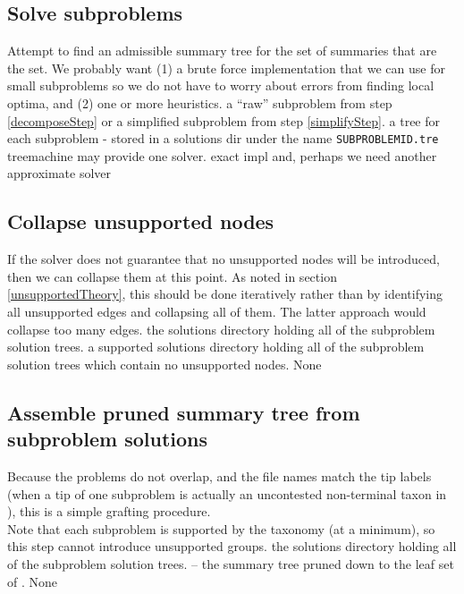 \documentclass[11pt]{article}
\begin{document}
\subsection{Solve subproblems}
\stepExplanation Attempt to find an admissible summary tree for the set of 
    summaries that are the \MSWIPSD set.
    We probably want (1) a brute force implementation that we can use for small
    subproblems so we do not have to worry about errors from finding local 
    optima, and (2) one or more heuristics.
\stepInput a ``raw'' subproblem from step \ref{decomposeStep} or a simplified 
    subproblem from step \ref{simplifyStep}.
\stepOutput a tree for each subproblem - stored in a solutions dir under the name
    \texttt{SUBPROBLEMID.tre}
\currImpl treemachine may provide one solver.
\implTODO exact impl and, perhaps we need another approximate solver
\currURL 
 
\subsection{Collapse unsupported nodes}
\stepExplanation If the solver does not guarantee that no unsupported nodes will
    be introduced, then we can collapse them at this point.
    As noted in section \ref{unsupportedTheory}, this should be done
    iteratively rather than by identifying all unsupported edges and 
    collapsing all of them.
    The latter approach would collapse too many edges.
\stepInput the solutions directory holding all of the subproblem solution trees.
\stepOutput a supported solutions directory holding all of the subproblem solution trees
    which contain no unsupported nodes.
\currImpl None
\implTODO {}

\subsection{Assemble pruned summary tree from subproblem solutions}\label{assemblyStep}
\stepExplanation Because the problems do not overlap, and the file names 
    match the tip labels (when a tip of one subproblem is actually an uncontested
    non-terminal taxon in \prunedTaxonomy), this is a simple grafting procedure.\\
    Note that each subproblem is supported by the taxonomy (at a minimum), so this
    step cannot introduce unsupported groups.
\stepInput the solutions directory holding all of the subproblem solution trees.
\stepOutput \prunedSummary -- the summary tree pruned down to the leaf set of \prunedTaxonomy.
\currImpl None
\implTODO {}
 
\end{document}
